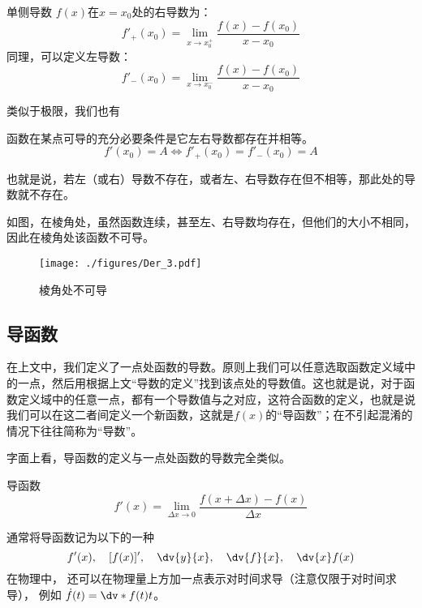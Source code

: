 \begin{definition}{单侧导数}\label{Der_def1}
$f(x)$在$x=x_0$处的右导数为：
\begin{equation}
f'_+(x_0) = \lim_{x\to x_0^+} \frac{f(x)-f(x_0)}{x-x_0}
\end{equation}
同理，可以定义左导数：
\begin{equation}
f'_-(x_0) = \lim_{x\to x_0^-} \frac{f(x)-f(x_0)}{x-x_0}
\end{equation}
\end{definition}

类似于极限，我们也有
\begin{theorem}{}
函数在某点可导的充分必要条件是它左右导数都存在并相等。
$$f'(x_0)=A\Longleftrightarrow f'_+(x_0)=f'_-(x_0)=A$$

也就是说，若左（或右）导数不存在，或者左、右导数存在但不相等，那此处的导数就不存在。
\end{theorem}

\begin{example}{}
如图，在棱角处，虽然函数连续，甚至左、右导数均存在，但他们的大小不相同，因此在棱角处该函数不可导。
\begin{figure}[ht]
\centering
\texttt{[image: ./figures/Der\_3.pdf]}
\caption{棱角处不可导}
\end{figure}

\end{example}
\subsection{导函数}
在上文中，我们定义了一点处函数的导数。原则上我们可以任意选取函数定义域中的一点，然后用根据上文“导数的定义”找到该点处的导数值。这也就是说，对于函数定义域中的任意一点，都有一个导数值与之对应，这符合函数的定义，也就是说我们可以在这二者间定义一个新函数，这就是$f(x)$的“导函数”；在不引起混淆的情况下往往简称为“导数”。

字面上看，导函数的定义与一点处函数的导数完全类似。
\begin{definition}{导函数}
\begin{equation}
f'(x)=\lim_{\Delta x\to0}\frac{f(x+\Delta x)-f(x)}{\Delta x}
\end{equation}
\end{definition}

通常将导函数记为以下的一种%
\begin{equation}\label{Der_eq1}
f'(x),\quad [f(x)]',\quad \dv{y}{x},\quad \dv{f}{x},\quad \dv{x}f(x)
\end{equation}
在物理中， 还可以在物理量上方加一点表示对时间求导（注意仅限于对时间求导）， 例如 $\dot f(t) = \dv*{f(t)}{t}$。

